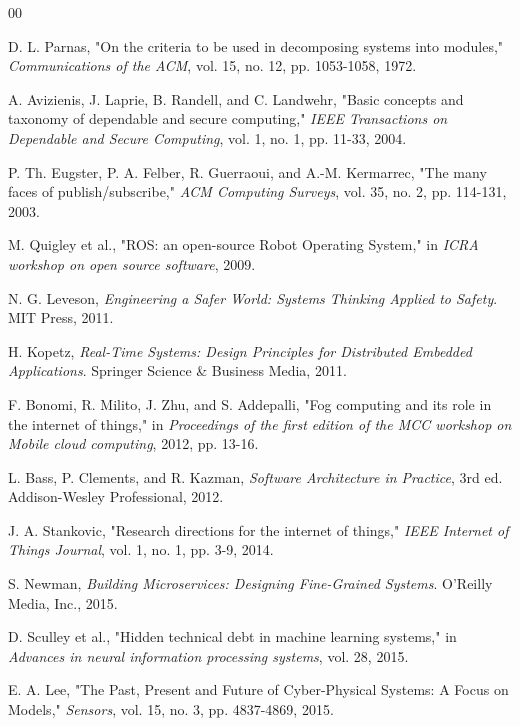 \documentclass[conference]{IEEEtran}
\begin{document}
\begin{thebibliography}{00}

 D. L. Parnas, "On the criteria to be used in decomposing systems into modules," \textit{Communications of the ACM}, vol. 15, no. 12, pp. 1053-1058, 1972.

 A. Avizienis, J. Laprie, B. Randell, and C. Landwehr, "Basic concepts and taxonomy of dependable and secure computing," \textit{IEEE Transactions on Dependable and Secure Computing}, vol. 1, no. 1, pp. 11-33, 2004.

 P. Th. Eugster, P. A. Felber, R. Guerraoui, and A.-M. Kermarrec, "The many faces of publish/subscribe," \textit{ACM Computing Surveys}, vol. 35, no. 2, pp. 114-131, 2003.

 M. Quigley et al., "ROS: an open-source Robot Operating System," in \textit{ICRA workshop on open source software}, 2009.

 N. G. Leveson, \textit{Engineering a Safer World: Systems Thinking Applied to Safety}. MIT Press, 2011.

 H. Kopetz, \textit{Real-Time Systems: Design Principles for Distributed Embedded Applications}. Springer Science \& Business Media, 2011.

 F. Bonomi, R. Milito, J. Zhu, and S. Addepalli, "Fog computing and its role in the internet of things," in \textit{Proceedings of the first edition of the MCC workshop on Mobile cloud computing}, 2012, pp. 13-16.

 L. Bass, P. Clements, and R. Kazman, \textit{Software Architecture in Practice}, 3rd ed. Addison-Wesley Professional, 2012.

 J. A. Stankovic, "Research directions for the internet of things," \textit{IEEE Internet of Things Journal}, vol. 1, no. 1, pp. 3-9, 2014.

 S. Newman, \textit{Building Microservices: Designing Fine-Grained Systems}. O'Reilly Media, Inc., 2015.

 D. Sculley et al., "Hidden technical debt in machine learning systems," in \textit{Advances in neural information processing systems}, vol. 28, 2015.

 E. A. Lee, "The Past, Present and Future of Cyber-Physical Systems: A Focus on Models," \textit{Sensors}, vol. 15, no. 3, pp. 4837-4869, 2015.


\end{thebibliography}
\end{document}
